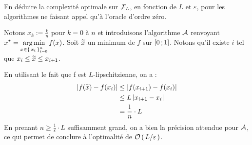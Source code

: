 \begin{qst}
En déduire la complexité optimale sur $\mathcal { F } _ { L }$, en fonction de $L$ et $\varepsilon$, pour les algorithmes ne faisant appel qu’à l’oracle d’ordre zéro.
\end{qst}

\begin{rep}

Notons $x_k := \frac{k}{n}$ pour $k=0$ à $n$ et introduisons l'algorithme $\mathcal{A}$
 renvoyant $\displaystyle \xopt = \argmin_{x \in \acc{x_i}_{i=0}^n} f(x)$.
 Soit $\widetilde{x}$ un minimum de $f$ sur $\mathopen{[}0\mathpunct{};1\mathclose{]}$. Notons qu'il existe $i$ tel
  que $ x_i \leq \widetilde{x} \leq x_{i+1}$.

  En utilisant le fait que f est $L$-lipschitzienne, on a :
  \begin{align*}
    \abs{f(\xtilde)-f(x_i)} &\leq \abs{f(x_{i+1})-f(x_i)}\\
    &\leq L \abs{x_{i+1}-x_i}\\
    &= \frac{1}{n} \cdot L
  \end{align*}
  En prenant $n\geq \frac{1}{\varepsilon}\cdot L$ suffisamment grand, on a bien
la précision attendue pour $\mathcal{A}$, ce qui permet de conclure à l'optimalité de $\mathcal{O}\left( \, L/\varepsilon \, \right)$. 
\end{rep}
